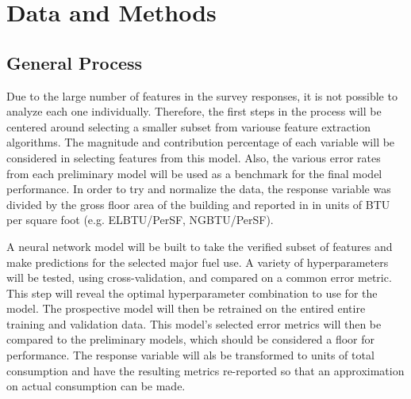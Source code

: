 \section{Data and Methods}
\subsection{General Process}

Due to the large number of features in the survey responses, it is not possible to analyze each one individually.  Therefore, the first steps in the process will be centered around selecting a smaller subset from variouse feature extraction algorithms.  The magnitude and contribution percentage of each variable will be considered in selecting features from this model.  Also, the various error rates from each preliminary model will be used as a benchmark for the final model performance.  In order to try and normalize the data, the response variable was divided by the gross floor area of the building and reported in in units of BTU per square foot (e.g. ELBTU/PerSF, NGBTU/PerSF). 

A neural network model will be built to take the verified subset of features and make predictions for the selected major fuel use.  A variety of hyperparameters will be tested, using cross-validation, and compared on a common error metric.  This step will reveal the optimal hyperparameter combination to use for the model.  The prospective model will then be retrained on the entired entire training and validation data.  This model's selected error metrics will then be compared to the preliminary models, which should be considered a floor for performance.  The response variable will als be transformed to units of total consumption and have the resulting metrics re-reported so that an approximation on actual consumption can be made.